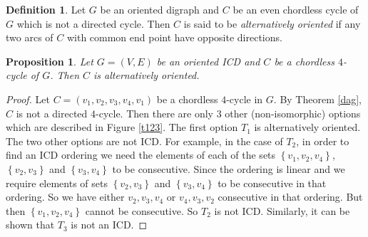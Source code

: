 \documentclass{article}
\newtheorem{prop}[thm]{Proposition}
\theoremstyle{definition}
\newtheorem{defn}[thm]{Definition}
\numberwithin{equation}{section}
\newcommand{\set}[1]{\left\{#1\right\}}
\begin{document}
\begin{defn}
Let $G$ be an oriented digraph and $C$ be an even chordless cycle of $G$ which is not a directed cycle. Then $C$ is said to be {\em alternatively oriented} if any two arcs of $C$ with common end point have opposite directions.  
\end{defn}

\begin{prop}\label{alternative}
Let $G=(V,E)$ be an oriented ICD and $C$ be a chordless $4$-cycle of $G$. Then $C$ is alternatively oriented.
\end{prop}

\begin{proof}
Let $C=(v_{1},v_{2},v_{3},v_{4},v_1)$ be a chordless $4$-cycle in $G$. By Theorem \ref{dag}, $C$ is not a directed $4$-cycle. Then there are only $3$ other (non-isomorphic) options which are described in Figure \ref{t123}. The first option $T_1$ is alternatively oriented. The two other options are not ICD. For example, in the case of $T_2$, in order to find an ICD ordering we need the elements of each of the sets $\set{v_1,v_2,v_4}$, $\set{v_2,v_3}$ and $\set{v_3,v_4}$ to be consecutive. Since the ordering is linear and we require elements of sets $\set{v_2,v_3}$ and $\set{v_3,v_4}$ to be consecutive in that ordering. So we have either $v_2,v_3,v_4$ or $v_4,v_3,v_2$ consecutive in that ordering. But then $\set{v_1,v_2,v_4}$ cannot be consecutive. So $T_2$ is not ICD. Similarly, it can be shown that $T_3$ is not an ICD.
\end{proof}  
\end{document}
